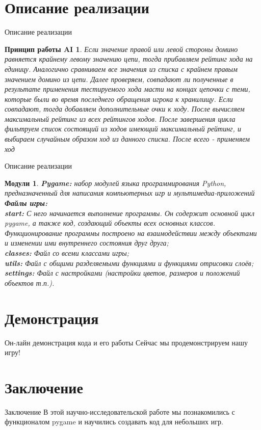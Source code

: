 \documentclass[handout]{beamer}
\newtheorem*{comp2}{Принцип работы AI}
\newtheorem*{modules}{Модули}
\begin{document}
 \section{Описание реализации}
\begin{frame}{Описание реализации}
	\begin{comp2}
		  Если значение правой или левой стороны домино равняется крайнему левому значению цепи, тогда прибавляем рейтинг хода на единицу. Аналогично сравниваем все значения из списка с крайнем правым значением домино из цепи. Далее проверяем, совпадают ли полученные в результате применения тестируемого хода масти на концах цепочки с теми, которые были во время последнего обращения игрока к хранилищу. Если совпадают, тогда добавляем дополнительные очки к ходу. После вычисляем максимальный рейтинг из всех рейтингов ходов. После завершения цикла фильтруем список состоящий из ходов имеющий максимальный рейтинг, и выбираем случайным образом ход из данного списка.
		 После всего - применяем ход
	\end{comp2}
\end{frame}

  \begin{frame}{Описание реализации}
	
	\begin{modules}
    \textbf{Pygame:} набор модулей языка программирования Python, предназначенный для написания компьютерных игр и мультимедиа-приложений\\
     \textbf{Файлы игры:}\\
     \textbf{start:} С него начинается выполнение программы. Он содержит основной цикл pygame, а также код, создающий объекты всех основных классов. Функционирование программы построено на взаимодействии между объектами и изменении ими внутреннего состояния друг друга;\\
     \textbf{classes:} Файл со всеми классами игры;\\
     \textbf{utils:} Файл с общими разделяемыми функциями и функциями отрисовки слоёв;\\
     \textbf{settings:} Файл с настройками (настройки цветов, размеров и положений объектов т.п.).
	\end{modules}
\end{frame}

	
	\section{Демонстрация}
	\begin{frame}{Он-лайн демонстрация кода и его работы}
		Сейчас мы продемонстрируем нашу игру!\centering		
	\end{frame}
	
	
	\section{Заключение}
	\begin{frame}{Заключение}
		 В этой научно-исследовательской работе мы познакомились с функционалом pygame и научились создавать код для небольших игр.		
	\end{frame}
	
\end{document}
